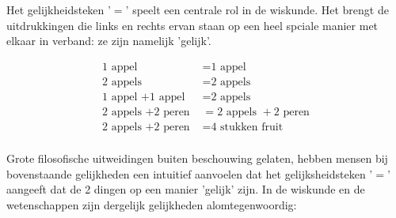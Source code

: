 \documentclass{ximera}
\begin{document}
	\author{Wiskunde Op Maat}

   
  Het gelijkheidsteken '\( = \)' speelt een centrale rol in de wiskunde.  Het brengt de uitdrukkingen die links en rechts ervan staan op een heel spciale manier met elkaar in verband: ze zijn namelijk 'gelijk'. 


\begin{align*}
    \text{1 appel }                        & =  \text{1 appel                   }\\
    \text{2 appels }                       & =  \text{2 appels                  }\\
    \text{1 appel } + \text{1 appel }      & =  \text{2 appels                  }\\
    \text{2 appels } + \text{2 peren }     & =  \text{2 appels } + \text{2 peren}\\
    \text{2 appels } + \text{2 peren }     & =  \text{4 stukken fruit }\\
\end{align*}

Grote filosofische uitweidingen buiten beschouwing gelaten, hebben mensen bij bovenstaande gelijkheden een intuitief aanvoelen dat het gelijksheidsteken 
'\( = \)' aangeeft dat de 2 dingen op een manier 'gelijk' zijn. In de wiskunde en de wetenschappen zijn dergelijk gelijkheden alomtegenwoordig: 
\end{document}

